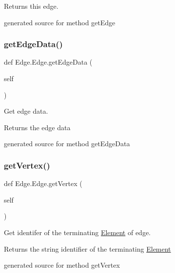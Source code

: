 Returns this edge. 

\begin{DoxyVerb}generated source for method getEdge \end{DoxyVerb}
 \hypertarget{class_edge_1_1_edge_af1ad9cb4a110bd498051374523eb725c}{}\label{class_edge_1_1_edge_af1ad9cb4a110bd498051374523eb725c} 
\subsubsection{\texorpdfstring{get\+Edge\+Data()}{getEdgeData()}}
{\footnotesize\ttfamily def Edge.\+Edge.\+get\+Edge\+Data (\begin{DoxyParamCaption}\item[{}]{self }\end{DoxyParamCaption})}



Get edge data. 

\begin{DoxyReturn}{Returns}
the edge data\begin{DoxyVerb}generated source for method getEdgeData \end{DoxyVerb}
 
\end{DoxyReturn}
\hypertarget{class_edge_1_1_edge_ab5783c6a39d90dbd42653a9d07682929}{}\label{class_edge_1_1_edge_ab5783c6a39d90dbd42653a9d07682929} 
\subsubsection{\texorpdfstring{get\+Vertex()}{getVertex()}}
{\footnotesize\ttfamily def Edge.\+Edge.\+get\+Vertex (\begin{DoxyParamCaption}\item[{}]{self }\end{DoxyParamCaption})}



Get identifer of the terminating \hyperlink{namespace_element}{Element} of edge. 

\begin{DoxyReturn}{Returns}
the string identifier of the terminating \hyperlink{namespace_element}{Element}\begin{DoxyVerb}generated source for method getVertex \end{DoxyVerb}
 
\end{DoxyReturn}
\hypertarget{class_edge_1_1_edge_ab0a0b2adc8d1662581d56557a3fc0df3}{}\label{class_edge_1_1_edge_ab0a0b2adc8d1662581d56557a3fc0df3} 
